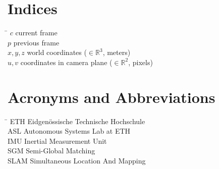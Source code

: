 \section*{Indices}
\begin{tabbing}
 \hspace*{1.6cm}  \= \kill
 $c$ \> current frame \\[0.5ex]
 $p$ \> previous frame \\[0.5ex]
 $x, y, z$ \> world coordinates ($\in \mathbb{R}^3$, \unit{meters}) \\[0.5ex]
 $u, v$ \> coordinates in camera plane ($\in \mathbb{R}^2$, \unit{pixels}) \\[0.5ex]

\end{tabbing}

\section*{Acronyms and Abbreviations}
\begin{tabbing}
 \hspace*{1.6cm}  \= \kill
 ETH \> Eidgenössische Technische Hochschule \\[0.5ex]
 ASL \> Autonomous Systems Lab at ETH \\[0.5ex]
 IMU \> Inertial Measurement Unit \\[0.5ex]
 SGM \> Semi-Global Matching \\[0.5ex]
 SLAM \> Simultaneous Location And Mapping \\[0.5ex]
\end{tabbing}
